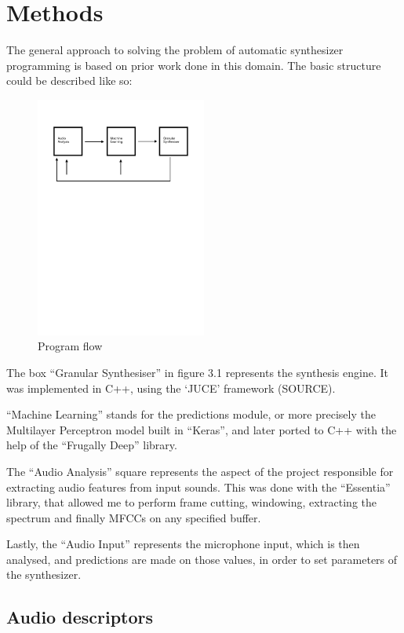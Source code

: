 \chapter{Methods}
\label{chap:meth}

The general approach to solving the problem of automatic synthesizer
programming is based on prior work done in this domain. The basic
structure could be described like so:

\begin{figure}[h]
\caption{Program flow}
\centering
\includegraphics[width=0.5\textwidth]{images/flowchart}
\end{figure}

The box ``Granular Synthesiser'' in figure 3.1 represents the synthesis
engine. It was implemented in C++, using the `JUCE' framework
(SOURCE).

``Machine Learning'' stands for the predictions module, or more
precisely the Multilayer Perceptron model built in ``Keras'', and
later ported to C++ with the help of the ``Frugally Deep'' library.

The ``Audio Analysis'' square represents the aspect of the
project responsible for extracting audio features from input
sounds. This was done with the ``Essentia'' library, that allowed me
to perform frame cutting, windowing, extracting the spectrum and
finally MFCCs on any specified buffer.

Lastly, the ``Audio Input'' represents the microphone input, which is then
analysed, and predictions are made on those values, in order to set
parameters of the synthesizer.

\section{Audio descriptors}

